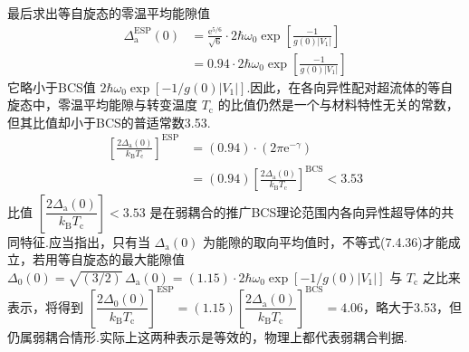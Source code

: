 最后求出等自旋态的零温平均能隙值
\begin{equation}
\begin{aligned}
  \Delta_{\mathrm{a}}^{\mathrm{ESP}}(0)
  &=\frac{\mathrm{e}^{5/6}}{\sqrt{6}}\cdot2\hbar\omega_{0}
  \exp\left[\frac{-1}{g(0)\left|V_{1}\right|}\right]\\
  &=0.94\cdot2\hbar\omega_{0}\exp\left[\frac{-1}{g(0)\left|V_{1}\right|}\right]
\end{aligned}
\end{equation}
它略小于BCS值 $2\hbar\omega_{0}\exp\left[-1/g(0)\left|V_{1}\right|\right]$.因此，在各向异性配对超流体的等自旋态中，零温平均能隙与转变温度 $T_{\mathrm{c}}$ 的比值仍然是一个与材料特性无关的常数，但其比值却小于BCS的普适常数3.53.
\begin{equation}
\begin{aligned}
  \left[\frac{2\Delta_{\mathrm{a}}(0)}{k_{\mathrm{B}}T_{\mathrm{c}}}\right]^{\mathrm{ESP}}
  &=(0.94)\cdot\left(2\pi\mathrm{e}^{-\gamma}\right)\\
  &=(0.94)\left[\frac{2\Delta_{\mathrm{a}}(0)}{k_{\mathrm{B}}T_{\mathrm{c}}}\right]^{\mathrm{BCS}}<3.53
\end{aligned}
\end{equation}
比值 $\left[\dfrac{2\Delta_{\mathrm{a}}(0)}{k_{\mathrm{B}}T_{\mathrm{c}}}\right]<3.53$ 是在弱耦合的推广BCS理论范围内各向异性超导体的共同特征.应当指出，只有当 $\Delta_{\mathrm{a}}(0)$ 为能隙的取向平均值时，不等式(7.4.36)才能成立，若用等自旋态的最大能隙值 $\Delta_{0}(0)=\sqrt{\left(3/2\right)}\,\Delta_{\mathrm{a}}(0)=\left(1.15\right)\cdot2\hbar\omega_{0}\exp\left[-1/g(0)\left|V_{1}\right|\right]$ 与 $T_{\mathrm{c}}$ 之比来表示，将得到 $\left[\dfrac{2\Delta_{0}(0)}{k_{\mathrm{B}}T_{\mathrm{c}}}\right]^{\mathrm{ESP}}=\left(1.15\right)\left[\dfrac{2\Delta_{\mathrm{a}}(0)}{k_{\mathrm{B}}T_{\mathrm{c}}}\right]^{\mathrm{BCS}}=4.06$，略大于3.53，但仍属弱耦合情形.实际上这两种表示是等效的，物理上都代表弱耦合判据.

